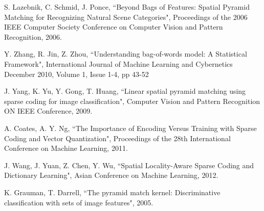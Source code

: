 \documentclass[conference]{IEEEtran}
\begin{document}
\begin{thebibliography}{1}

S. Lazebnik, C. Schmid, J. Ponce, ``Beyond Bags of Features: Spatial Pyramid Matching for Recognizing Natural Scene Categories", Proceedings of the 2006
IEEE Computer Society Conference on Computer Vision and Pattern Recognition, 2006.

Y. Zhang, R. Jin, Z. Zhou, ``Understanding bag-of-words model: A Statistical Framework", International Journal of Machine Learning and Cybernetics
December 2010, Volume 1, Issue 1-4, pp 43-52

J. Yang, K. Yu, Y. Gong, T. Huang, ``Linear spatial pyramid matching using sparse coding for image classification", 
Computer Vision and Pattern Recognition ON IEEE Conference, 2009.

A. Coates, A. Y. Ng, ``The Importance of Encoding Versus Training with Sparse Coding and Vector Quantization", Proceedings of the 28th International Conference on Machine Learning, 2011.

J. Wang, J. Yuan, Z. Chen, Y. Wu, ``Spatial Locality-Aware Sparse Coding and Dictionary Learning", Asian Conference on Machine Learning, 2012.

K. Grauman, T. Darrell, ``The pyramid match kernel: Discriminative classification with sets of image features", 2005.

\end{thebibliography}

\end{document}
